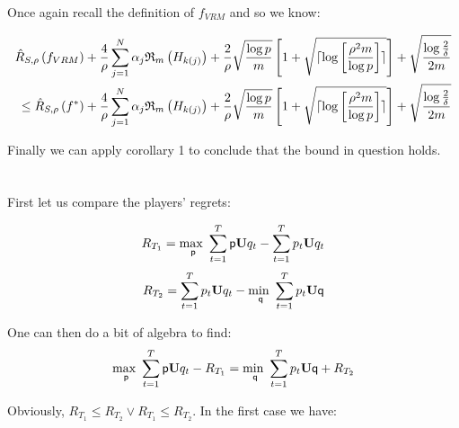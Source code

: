 \documentclass[]{article}
\begin{document}
\noindent Once again recall the definition of $f_{VRM}$ and so we know:

\begin{equation}
\begin{split}
\hat{R}_{S,\rho}\left(f_{VRM}\right) + \frac{4}{\rho} \sum_{j=1}^{N} \alpha_j \mathfrak{R}_m \left( H_{k \left( j \right)} \right) + \frac{2}{\rho} \sqrt{\frac{\log p}{m}} \left[1+\sqrt{\lceil \log \left[ \frac{\rho^2 m}{\log p} \right]\rceil}\right] + \sqrt{\frac{\log \frac{2}{\delta}}{2m}} \\
\le \hat{R}_{S,\rho}\left(f^*\right) + \frac{4}{\rho} \sum_{j=1}^{N} \alpha_j \mathfrak{R}_m \left( H_{k \left( j \right)} \right) + \frac{2}{\rho} \sqrt{\frac{\log p}{m}} \left[1+\sqrt{\lceil \log \left[ \frac{\rho^2 m}{\log p} \right]\rceil}\right] + \sqrt{\frac{\log \frac{2}{\delta}}{2m}}
\end{split}
\notag
\end{equation}

\noindent Finally we can apply corollary 1 to conclude that the bound in question holds.	

\section{}
\subsection{}

First let us compare the players' regrets:

\begin{equation}
	R_{T_1} = \underset{\mathsf{p}}{\text{max }} \sum_{t=1}^{T} \mathsf{p} \textbf{U} q_t - \sum_{t=1}^{T} p_t \textbf{U} q_t
\notag
\end{equation}
\begin{equation}
	R_{T_2} = \sum_{t=1}^{T} p_t \textbf{U} q_t - \underset{\mathsf{q}}{\text{min }} \sum_{t=1}^{T} p_t \textbf{U} \mathsf{q}
\notag
\end{equation}

\noindent One can then do a bit of algebra to find:
\begin{equation}
	\underset{\mathsf{p}}{\text{max }} \sum_{t=1}^{T} \mathsf{p} \textbf{U} q_t - R_{T_1} = \underset{\mathsf{q}}{\text{min }} \sum_{t=1}^{T} p_t \textbf{U} \mathsf{q} + R_{T_2}
\notag
\end{equation}

\noindent Obviously, $R_{T_1} \le R_{T_2} \lor R_{T_1} \le R_{T_2}$. In the first case we have:
	
\end{document}

